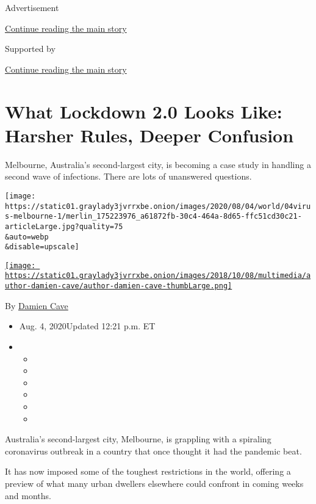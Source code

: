 Advertisement

\protect\hyperlink{after-top}{Continue reading the main story}

Supported by

\protect\hyperlink{after-sponsor}{Continue reading the main story}

\hypertarget{what-lockdown-20-looks-like-harsher-rules-deeper-confusion}{%
\section{What Lockdown 2.0 Looks Like: Harsher Rules, Deeper
Confusion}\label{what-lockdown-20-looks-like-harsher-rules-deeper-confusion}}

Melbourne, Australia's second-largest city, is becoming a case study in
handling a second wave of infections. There are lots of unanswered
questions.

\texttt{[image: https://static01.graylady3jvrrxbe.onion/images/2020/08/04/world/04virus-melbourne-1/merlin\_175223976\_a61872fb-30c4-464a-8d65-ffc51cd30c21-articleLarge.jpg?quality=75\\\&auto=webp\\\&disable=upscale]}

\href{https://www.nytimes3xbfgragh.onion/by/damien-cave}{\texttt{[image: https://static01.graylady3jvrrxbe.onion/images/2018/10/08/multimedia/author-damien-cave/author-damien-cave-thumbLarge.png]}}

By \href{https://www.nytimes3xbfgragh.onion/by/damien-cave}{Damien Cave}

\begin{itemize}
\item
  Aug. 4, 2020Updated 12:21 p.m. ET
\item
  \begin{itemize}
  \item
  \item
  \item
  \item
  \item
  \item
  \end{itemize}
\end{itemize}

Australia's second-largest city, Melbourne, is grappling with a
spiraling coronavirus outbreak in a country that once thought it had the
pandemic beat.

It has now imposed some of the toughest restrictions in the world,
offering a preview of what many urban dwellers elsewhere could confront
in coming weeks and months.

